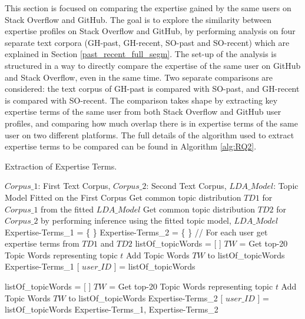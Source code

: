         This section is focused on comparing the expertise gained by the same users on Stack Overflow and GitHub. The goal is to explore the similarity between expertise profiles on Stack Overflow and GitHub, by performing analysis on four separate text corpora (GH-past, GH-recent, SO-past and SO-recent) which are explained in Section \ref{past_recent_full_segm}. The set-up of the analysis is structured in a way to directly compare the expertise of the same user on GitHub and Stack Overflow, even in the same time. Two separate comparisons are considered: the text corpus of GH-past is compared with SO-past, and GH-recent is compared with SO-recent. The comparison takes shape by extracting key expertise terms of the same user from both Stack Overflow and GitHub user profiles, and comparing how much overlap there is in expertise terms of the same user on two different platforms. The full details of the algorithm used to extract expertise terms to be compared can be found in Algorithm \ref{alg:RQ2}.
        
        \begin{algorithm}
            \caption{Extraction of Expertise Terms.}
            \label{alg:RQ2}
            \begin{algorithmic}[1]
                \REQUIRE $Corpus\_1$: First Text Corpus, $Corpus\_2$: Second Text Corpus, $LDA\_Model$: Topic Model Fitted on the First Corpus
                \STATE Get common topic distribution $TD1$ for $Corpus\_1$ from the fitted $LDA\_Model$
                \STATE Get common topic distribution $TD2$ for $Corpus\_2$ by performing inference using the fitted topic model, $LDA\_Model$
                \STATE Expertise-Terms\_1 = \{ \}
                \STATE Expertise-Terms\_2 = \{ \}
                \STATE
                \STATE // For each user get expertise terms from $TD1$ and $TD2$ 
                    \STATE listOf\_topicWords = [ ]
                        \STATE $TW$ = Get top-20 Topic Words representing topic $t$
                        \STATE Add Topic Words $TW$ to listOf\_topicWords 
                    \ENDFOR
                    \STATE Expertise-Terms\_1 [ $user\_ID$ ] = listOf\_topicWords
                    \STATE
                    
                    \STATE listOf\_topicWords = [ ]
                        \STATE $TW$ = Get top-20 Topic Words representing topic $t$
                        \STATE Add Topic Words $TW$ to listOf\_topicWords 
                    \ENDFOR
                    \STATE Expertise-Terms\_2 [ $user\_ID$ ] = listOf\_topicWords
                    \STATE
                \ENDFOR
                \RETURN Expertise-Terms\_1, Expertise-Terms\_2
            \end{algorithmic}
        \end{algorithm}
        
